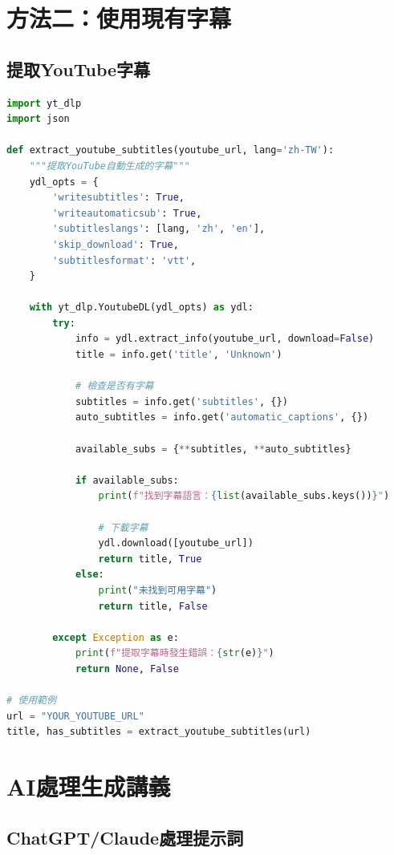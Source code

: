 \documentclass[12pt,a4paper]{article}
\begin{document}
\section{方法二：使用現有字幕}

\subsection{提取YouTube字幕}

\begin{lstlisting}[language=python, caption=提取YouTube自動字幕]
import yt_dlp
import json

def extract_youtube_subtitles(youtube_url, lang='zh-TW'):
    """提取YouTube自動生成的字幕"""
    ydl_opts = {
        'writesubtitles': True,
        'writeautomaticsub': True,
        'subtitleslangs': [lang, 'zh', 'en'],
        'skip_download': True,
        'subtitlesformat': 'vtt',
    }
    
    with yt_dlp.YoutubeDL(ydl_opts) as ydl:
        try:
            info = ydl.extract_info(youtube_url, download=False)
            title = info.get('title', 'Unknown')
            
            # 檢查是否有字幕
            subtitles = info.get('subtitles', {})
            auto_subtitles = info.get('automatic_captions', {})
            
            available_subs = {**subtitles, **auto_subtitles}
            
            if available_subs:
                print(f"找到字幕語言：{list(available_subs.keys())}")
                
                # 下載字幕
                ydl.download([youtube_url])
                return title, True
            else:
                print("未找到可用字幕")
                return title, False
                
        except Exception as e:
            print(f"提取字幕時發生錯誤：{str(e)}")
            return None, False

# 使用範例
url = "YOUR_YOUTUBE_URL"
title, has_subtitles = extract_youtube_subtitles(url)
\end{lstlisting}

\section{AI處理生成講義}

\subsection{ChatGPT/Claude處理提示詞}
\end{document}
